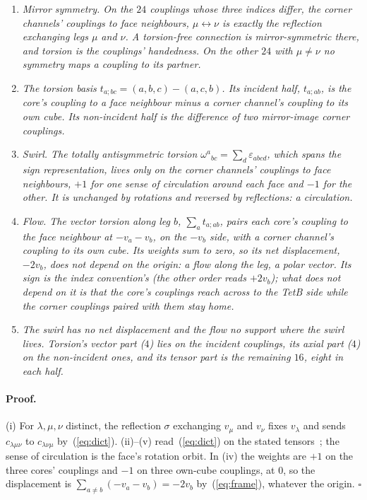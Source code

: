 \documentclass[twocolumn]{iopjournal}
\begin{document}
\begin{enumerate}
\item[(i)] \emph{Mirror symmetry. On the $24$ couplings whose three
  indices differ, the corner channels' couplings to face neighbours,
  $\mu \leftrightarrow \nu$ is exactly the reflection exchanging legs
  $\mu$ and $\nu$. A torsion-free connection is mirror-symmetric
  there, and torsion is the couplings' handedness. On the other $24$
  with $\mu \ne \nu$ no symmetry maps a coupling to its partner.}
\item[(ii)] \emph{The torsion basis $t_{a;bc} = (a,b,c) - (a,c,b)$.
  Its incident half, $t_{a;ab}$, is the core's coupling to a face
  neighbour minus a corner channel's coupling to its own cube. Its
  non-incident half is the difference of two mirror-image corner
  couplings.}
\item[(iii)] \emph{Swirl. The totally antisymmetric torsion
  $\omega^a{}_{bc} = \sum_d \varepsilon_{abcd}$, which spans the sign
  representation, lives only on the corner channels' couplings to face
  neighbours, $+1$ for one sense of circulation around each face and
  $-1$ for the other. It is unchanged by rotations and reversed by
  reflections: a circulation.}
\item[(iv)] \emph{Flow. The vector torsion along leg $b$,
  $\sum_a t_{a;ab}$, pairs each core's coupling to the face neighbour
  at $-v_a - v_b$, on the $-v_b$ side, with a corner channel's
  coupling to its own cube. Its weights sum to zero, so its net
  displacement, $-2v_b$, does not depend on the origin: a flow along
  the leg, a polar vector. Its sign is the index convention's (the
  other order reads $+2v_b$); what does not depend on it is that the
  core's couplings reach across to the TetB side while the corner
  couplings paired with them stay home.}
\item[(v)] \emph{The swirl has no net displacement and the flow no
  support where the swirl lives. Torsion's vector part ($4$) lies on
  the incident couplings, its axial part ($4$) on the non-incident
  ones, and its tensor part is the remaining $16$, eight in each
  half.}
\end{enumerate}

\paragraph{Proof.} (i) For $\lambda, \mu, \nu$ distinct, the
reflection $\sigma$ exchanging $v_\mu$ and $v_\nu$ fixes $v_\lambda$
and sends $c_{\lambda\mu\nu}$ to $c_{\lambda\nu\mu}$
by~(\ref{eq:dict}). (ii)--(v) read~(\ref{eq:dict}) on the stated
tensors~\cite{NelsonTorsion}; the sense of circulation is the face's
rotation orbit. In (iv) the weights are $+1$ on the three cores'
couplings and $-1$ on three own-cube couplings, at $0$, so the
displacement is $\sum_{a \ne b}(-v_a - v_b) = -2v_b$
by~(\ref{eq:frame}), whatever the origin. \hfill $\square$
\end{document}
